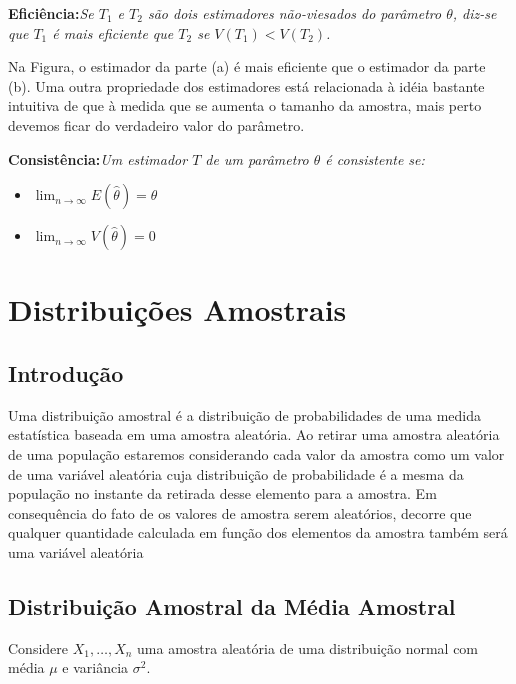 \documentclass[
]{book}
\providecommand{\tightlist}{%
  \setlength{\itemsep}{0pt}\setlength{\parskip}{0pt}}
\begin{document}
\textbf{Eficiência:}\emph{Se $T_1$ e $T_2$ são dois estimadores não-viesados do parâmetro $\theta$, diz-se que $T_1$ é mais eficiente que $T_2$ se $V(T_1)<V(T_2)$.}

Na Figura, o estimador da parte (a) é mais eficiente que o estimador da parte (b). Uma outra propriedade dos estimadores está relacionada à idéia bastante intuitiva de que à medida que se aumenta o tamanho da amostra, mais perto devemos ficar do verdadeiro valor do parâmetro.

\textbf{Consistência:}\emph{Um estimador $T$ de um parâmetro $\theta$ é consistente se:}

\begin{itemize}
\tightlist
\item
  \(\lim_{n\to\infty} E(\hat\theta)=\theta\)
\item
  \(\lim_{n\to\infty} V(\hat\theta)=0\)
\end{itemize}

\hypertarget{distribuiuxe7uxf5es-amostrais-1}{%
\chapter{Distribuições Amostrais}\label{distribuiuxe7uxf5es-amostrais-1}}

\hypertarget{introduuxe7uxe3o-3}{%
\section{Introdução}\label{introduuxe7uxe3o-3}}

Uma distribuição amostral é a distribuição de probabilidades de uma medida estatística baseada em uma amostra aleatória. Ao retirar uma amostra aleatória de uma população estaremos considerando cada valor da amostra como um valor de uma variável aleatória cuja distribuição de probabilidade é a mesma da população no instante da retirada desse elemento para a amostra. Em consequência do fato de os valores de amostra serem aleatórios, decorre que qualquer quantidade calculada em função dos elementos da amostra também será uma variável aleatória

\hypertarget{distribuiuxe7uxe3o-amostral-da-muxe9dia-amostral}{%
\section{Distribuição Amostral da Média Amostral}\label{distribuiuxe7uxe3o-amostral-da-muxe9dia-amostral}}

Considere \(X_1,\ldots,X_n\) uma amostra aleatória de uma distribuição normal com média \(\mu\) e variância \(\sigma^2\).
\end{document}
